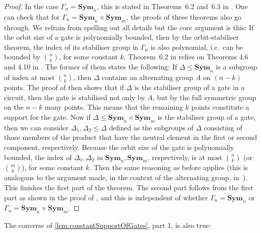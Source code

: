 \documentclass[10pt,a4paper]{article}
\theoremstyle{definition}
\theoremstyle{plain}
\theoremstyle{remark}
\newcommand{\Sym}{\mathbf{Sym}}
\begin{document}
\begin{proof}
	In the case $\Gamma_n = \Sym_n$, this is stated in
	Theorems~6.2 and~6.3 in \cite{dawar_symmetric_2025}.
	One can check that for $\Gamma_n = \Sym_n \times \Sym_m$, the proofs of these theorems also go through. We refrain from spelling out all details but the core argument is this: 
	If the orbit size of a gate is polynomially bounded, then by the orbit-stabiliser theorem, the index of its stabiliser group in $\Gamma_n$ is also polynomial, i.e.\ can be bounded by $\binom{n}{k}$, for some constant $k$.
	Theorem~6.2 in \cite{dawar_symmetric_2025} relies on Theorems 4.6 and 4.10 in \cite{dawar_rank_logic}. The former of them states the following: If $\Delta \leq \Sym_n$ is a subgroup of index at most $\binom{n}{k}$, then $\Delta$ contains an alternating group $A$ on $(n-k)$ points. The proof of \cite[Theorem 4.10]{dawar_rank_logic} then shows that if $\Delta$ is the stabiliser group of a gate in a circuit, then the gate is stabilised not only by $A$, but by the full symmetric group on the $n-k$ many points. 
	This means that the remaining $k$ points constitute a support for the gate. Now if $\Delta \leq \Sym_n \times \Sym_m$ is the stabiliser group of a gate, then we can consider $\Delta_1, \Delta_2 \leq \Delta$ defined as the subgroups of $\Delta$ consisting of those members of the product that have the neutral element in the first or second component, respectively. 
	Because the orbit size of the gate is polynomially bounded,
	the index of $\Delta_1, \Delta_2$ in $\Sym_n, \Sym_m$,
	respectively, is at most $\binom{n}{k}$ (or $\binom{m}{k}$),
	for some constant $k$. Then the same reasoning as before
	applies (this is analogous to the argument made, in the context of
	the alternating group, in~\cite{dawar2021lower}).
	This finishes the first part of the theorem. The second part follows from the first part as shown in the proof of  \cite[Theorem~6.3]{dawar_symmetric_2025}, and this is independent of whether $\Gamma_n = \Sym_n$ or $\Gamma_n = \Sym_n \times \Sym_m$.
\end{proof}	

The converse of \cref{lem:constantSupportOfGates}, part 1, is also true:
\end{document}

